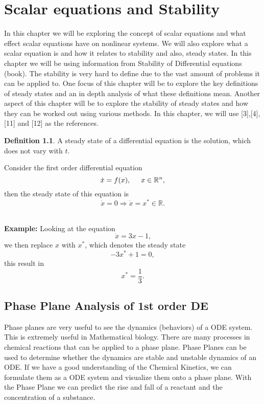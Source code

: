 \documentclass[a4paper]{report}
\theoremstyle{definition}
\newtheorem{defn}[thm]{Definition}
\begin{document}
\chapter{Scalar equations and Stability}
In this chapter we will be exploring the concept of scalar equations and what effect scalar equations have on nonlinear systems. We will also explore what a scalar equation is and how it relates to stability and also, steady states. In this chapter we will be using information from 
Stability of Differential equations (book). The stability is very hard to define due to the vast amount of problems it can be applied to. One focus of this chapter will be to explore the key definitions of steady states and an in depth analysis of what these definitions mean. Another aspect of this chapter will be to explore the stability of steady states and how they can be worked out using various methods. In this chapter, we will use  [3],[4],[11] and [12] as the references. 
\newline
  \begin{mdframed}[backgroundcolor=airforceblue!25] 
\begin{defn} \label{def1}
A steady state of a differential equation is the solution, which does not vary with $t$.

Consider the first order differential equation
\begin{equation}\label{eq:1}
\dot{x}=f(x),\hspace{5mm} x\in {\mathbb{R}^{n}},
\end{equation}
then the steady state of this equation is
 \begin{equation}\label{eq:2}
 \dot{x}=0    \Longrightarrow\dot{x}=  x^*\in\mathbb{R} .
\end{equation} \
\end{defn}
\end{mdframed}

\textbf{Example:} Looking at the equation
\begin{equation}
\dot{x}=3x-1\text{,}
 \end{equation}
we then replace $x$ with $x^*$, which denotes the steady state
 \begin{equation}\label{eq:3} 
 -3x^*+1=0,
 \end{equation}
 this result in
 \begin{equation}\label{eq:4}
 x^*=\frac{1}{3}\text{.} 
 \end{equation}



\section{Phase Plane Analysis of 1st order DE}
Phase planes are very useful to see the dynamics (behaviors) of a ODE system. This is extremely useful in Mathematical biology. There are many processes in chemical reactions that can be applied to a phase plane.
Phase Planes can be used to determine whether the dynamics are stable and unstable dynamics of an ODE. If we have a good understanding of the Chemical Kinetics, we can formulate them as a ODE system and visualize them onto a phase plane. With the Phase Plane we can predict the rise and fall of a reactant and the concentration of a substance.
\end{document}

